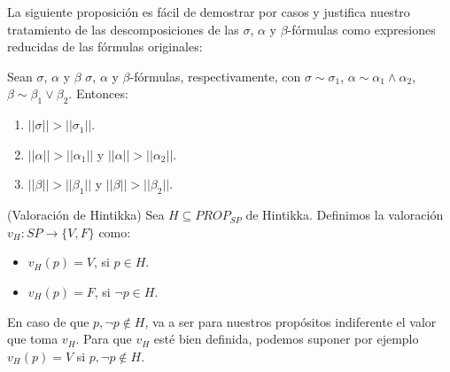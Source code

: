 La siguiente proposición es fácil de demostrar por casos y justifica nuestro tratamiento de las descomposiciones de las $\sigma$, $\alpha$ y $\beta$-fórmulas como expresiones reducidas de las fórmulas originales:

\begin{prop}\label{norma}
Sean $\sigma$, $\alpha$ y $\beta$ $\sigma$, $\alpha$ y $\beta$-fórmulas, respectivamente, con $\sigma \sim \sigma_1$, $\alpha \sim \alpha_1 \land \alpha_2$, $\beta \sim \beta_1 \lor \beta_2$. Entonces:
\begin{enumerate}
    \item $||\sigma|| > ||\sigma_1||$.
    \item $||\alpha||>||\alpha_1||$ y $||\alpha||>||\alpha_2||$.
    \item $||\beta||>||\beta_1||$ y $||\beta||>||\beta_2||$.
\end{enumerate}
\end{prop}

\begin{definition}(Valoración de Hintikka)
Sea $H \subseteq PROP_{SP}$ de Hintikka. Definimos la valoración $v_H:SP\to\{V,F\}$ como:
\begin{itemize}
    \item $v_H(p) = V$, si $p \in H$.
    \item $v_H(p) = F$, si $\neg p \in H$.
\end{itemize}
En caso de que $p, \neg p \notin H$, va a ser para nuestros propósitos indiferente el valor que toma $v_H$. Para que $v_H$ esté bien definida, podemos suponer por ejemplo $v_H(p)=V$ si $p, \neg p \notin H$.
\end{definition}

